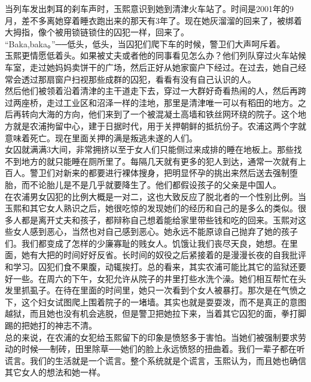 当列车发出刺耳的刹车声时，玉熙意识到她到清津火车站了。时间是2001年的9月，差不多离她穿着睡衣跑出来的那天有3年了。现在她灰溜溜的回来了，被绑着大拇指，像个被用锁链锁住的囚犯一样，回来了。\\

“Baka,baka。”──低头，低头，当囚犯们爬下车的时候，警卫们大声呵斥着。\\

玉熙更情愿低着头。如果被丈夫或者他的同事看见怎么办？他们列队穿过火车站候车室，走过她妈妈卖饼干的广场，然后正好从她家窗户下经过。在过去，她自己经常会透过那扇窗户扫视那些成群的囚犯，看看有没有自己认识的人。\\

然后他们被领着沿着清津的主干道走下去，穿过一大群好奇看热闹的人，然后再跨过两座桥，走过工业区和沼泽一样的洼地，那里是清津唯一可以有稻田的地方。之后再转向大海的方向，他们来到了一个被混凝土高墙和铁丝网环绕的院子。这个地方就是农浦拘留中心，建于日据时代，用于关押朝鲜的抵抗份子。农浦这两个字就意味着死亡。现在里面关押的满是叛逃未遂的人们。\\

女囚就满满3大间，非常拥挤以至于女人们只能侧过来成排的睡在地板上。那些找不到地方的就只能睡在厕所里了。每隔几天就有更多的犯人到达，通常一次就有上百人。警卫们对新来的都要进行裸体搜身，把明显怀孕的挑出来然后送去强制堕胎，而不论胎儿是不是几乎就要降生了。他们都假设孩子的父亲是中国人。\\

在农浦男女囚犯的比例大概是一对二，这也大致反应了脱北者的一个性别比例。当玉熙和其它女人熟识之后，她很吃惊的发现她们的经历和自己的是多么的类似。很多人都是离开丈夫和孩子，都辩称自己想着能给家里带些钱和吃的回来。玉熙对这些女人感到恶心，当然也对自己感到恶心。她永远不能原谅自己抛弃了她的孩子们。我们都变成了怎样的少廉寡耻的贱女人。饥饿让我们丧尽天良，她想。在里面，她有大把的时间好好反省。长时间的奴役之后紧接着的是漫漫长夜的自我批评和学习。囚犯们食不果腹，动辄挨打。总的看来，其实农浦可能比其它的监狱还要好一些。在周六的下午，女犯允许从院子的井里打些水洗个澡。她们相互帮忙在头发里抓虱子。在待在里面的时间里，她只一次看到个女人被暴打。那次是在气愤之下，这个妇女试图爬上围着院子的一堵墙。其实也就是耍耍泼，而不是真正的意图越狱，而且她也没有机会逃脱，但是警卫把她拉下来，当着其它囚犯的面，拳打脚踢的把她打的神志不清。\\

总的来说，在农浦的女犯给玉熙留下的印象是愤怒多于害怕。当她们被强制要求劳动的时候──制砖，田里除草──她们的脸上永远愤怒的扭曲着。我们一辈子都在听谎言。我们的生活就是一个谎言。整个系统就是个谎言，玉熙认为，而且她也确信其它女人的想法和她一样。\\

